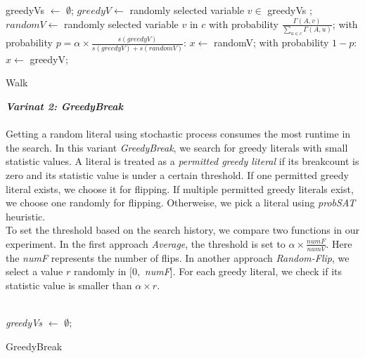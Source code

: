 \documentclass[12pt,a4paper,twoside]{scrartcl}
\numberwithin{equation}{section}
\begin{document}
\begin{algorithm}[H]
 greedyVs $\leftarrow$ $\emptyset$;\;
  $greedyV \leftarrow$   randomly selected variable $v \in$ greedyVs  ; \;
  $randomV \leftarrow$ randomly selected  variable $v$ in $c$ with probability $\frac{\Gamma(A,v)}{\sum_{u \in c}\Gamma(A,u)}$;  \;
  with probability $p = \alpha \times \frac{s(greedyV)}{s(greedyV)+s(randomV)}$: $x\leftarrow$ randomV;\;
    with probability $1-p$: $x\leftarrow$ greedyV;\;
\caption{Walk}
\end{algorithm} 
\clearpage
 \emph{\textbf{Varinat 2: GreedyBreak}}\\
\\ Getting a random literal using stochastic process consumes the most runtime in the search. In this variant \emph{GreedyBreak}, we search for greedy literals with small statistic values. A literal is treated as  a \emph{permitted greedy literal} if its breakcount is zero and its statistic value is under a certain threshold. If one permitted greedy literal exists, we choose it for flipping. If multiple permitted greedy literals exist, we choose one randomly for flipping. Otherweise, we pick a literal using \emph{probSAT} heuristic.\\ To set the threshold based on the search history, we compare two functions in our experiment. In the first approach \emph{Average}, the threshold is set to $\alpha \times \frac{numF}{numV}$. Here the \emph{numF} represents the number of flips. In another approach \emph{Random-Flip}, we select  a value $r $ randomly in $[0,$  \emph{numF}]. For each greedy literal, we check if its statistic value is smaller than $\alpha \times r$. \\
\\
\begin{algorithm}[H]
  \emph{greedyVs} $\leftarrow$ $\emptyset$;\;
  \;
\caption{GreedyBreak}
\end{algorithm} 
\end{document}
